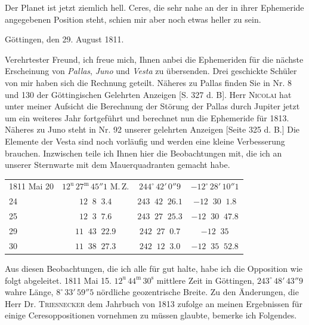 \par\indent Der Planet ist jetzt ziemlich hell. Ceres, die sehr nahe an der in ihrer Ephemeride angegebenen Position steht, schien mir aber noch etwas heller zu sein.
\begin{flushright}Göttingen, den 29. August 1811.\end{flushright}
\par\indent Verehrtester Freund, ich freue mich, Ihnen anbei die Ephemeriden für die nächste Erscheinung von \emph{Pallas}, \emph{Juno} und \emph{Vesta} zu übersenden. Drei geschickte Schüler von mir haben sich die Rechnung geteilt. Näheres zu Pallas finden Sie in Nr. 8 und 130 der Göttingischen Gelehrten Anzeigen [S. 327 d. B]. Herr \textsc{Nicolai} hat unter meiner Aufsicht die Berechnung der Störung der Pallas durch Jupiter jetzt um ein weiteres Jahr fortgeführt und berechnet nun die Ephemeride für 1813. Näheres zu Juno steht in Nr. 92 unserer gelehrten Anzeigen [Seite 325 d. B.] Die Elemente der Vesta sind noch vorläufig und werden eine kleine Verbesserung brauchen. Inzwischen teile ich Ihnen hier die Beobachtungen mit, die ich an unserer Sternwarte mit dem Mauerquadranten gemacht habe.
\begin{center}\fontsize{10}{12}\selectfont\setlength{\tabcolsep}{4pt}\renewcommand{\arraystretch}{1.15}
\begin{tabular}{l|c|c|c}
1811 Mai 20 & $12^{\mathrm u}\,27^{\mathrm m}\,45''1$ M.\,Z. & $244^\circ\,42'\,0''9$ & $-12^\circ\,28'\,10''1$ \\
\phantom{1811 Mai }24 & $12\;\;8\;\;3.4$ & $243\;\;42\;\;26.1$ & $-12\;\;30\;\;1.8$ \\
\phantom{1811 Mai }25 & $12\;\;3\;\;7.6$ & $243\;\;27\;\;25.3$ & $-12\;\;30\;\;47.8$ \\
\phantom{1811 Mai }29 & $11\;\;43\;\;22.9$ & $242\;\;27\;\;0.7$ & $-12\;\;35$ \\
\phantom{1811 Mai }30 & $11\;\;38\;\;27.3$ & $242\;\;12\;\;3.0$ & $-12\;\;35\;\;52.8$ \\
\end{tabular}
\end{center}


\par\indent Aus diesen Beobachtungen, die ich alle für gut halte, habe ich die Opposition wie folgt abgeleitet. 1811 Mai 15. $12^{\mathrm u}\,44^{\mathrm m}\,30^{\mathrm s}$ mittlere Zeit in Göttingen, $243^\circ\,48'\,43''9$ wahre Länge, $8^\circ\,33'\,59''5$ nördliche geozentrische Breite. Zu den Änderungen, die Herr Dr. \textsc{Triesnecker} dem Jahrbuch von 1813 zufolge an meinen Ergebnissen für einige Ceresoppositionen vornehmen zu müssen glaubte, bemerke ich Folgendes.

